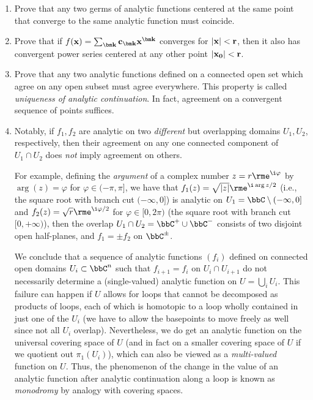 \begin{xca}
    \begin{enumerate}
        \item Prove that any two germs of analytic functions centered at the same point that converge to the same analytic function must coincide.
        \item Prove that if $f(\bf{x})=\sum_{\bm k} c_{\bm k} {\bf x}^{\bm k}$ converges for $|\bf x|<r$, then it also has convergent power series centered at any other point $|\bf{x}_0|<r$.
        \item Prove that any two analytic functions defined on a connected open set which agree on any open subset must agree everywhere. This property is called \emph{uniqueness of analytic continuation}. In fact, agreement on a convergent sequence of points suffices.
        \item Notably, if $f_1,f_2$ are analytic on two \emph{different} but overlapping domains $U_1,U_2$, respectively, then their agreement on any one connected component of $U_1\cap U_2$ does \emph{not} imply agreement on others. 
        
        For example, defining the \emph{argument}  of a complex number $z=r\rme^{\i \varphi}$ by $\arg(z)=\varphi$ for $\varphi\in (-\pi,\pi]$, we have that $f_1(z)=\sqrt{|z|}\rme^{\i \arg z/2}$ (i.e., the square root with branch cut $(-\infty,0]$) is analytic on $U_1=\bbC\setminus (-\infty,0]$ and $f_2(z)=\sqrt{r}\rme^{\i \varphi/2}$ for $\varphi\in [0,2\pi)$ (the square root with branch cut $[0,+\infty)$), then the overlap $U_1\cap U_2=\bbC^+\cup \bbC^-$ consists of two disjoint open half-planes, and $f_1=\pm f_2$ on $\bbC^\pm$. 
        
        We conclude that a sequence of analytic functions $(f_i)$ defined on connected open domains $U_i\subset\bbC^n$ such that $f_{i+1}=f_i$ on $U_i\cap U_{i+1}$ do not necessarily determine a (single-valued) analytic function on $U=\bigcup_i U_i$. This failure can happen if $U$ allows for loops that cannot be decomposed as products of loops, each of which is homotopic to a loop wholly contained in just one of the $U_i$ (we have to allow the basepoints to move freely as well since not all $U_i$ overlap). Nevertheless, we do get an analytic function on the universal covering space of $U$ (and in fact on a smaller covering space of $U$ if we quotient out $\pi_1(U_i)$), which can also be viewed as a \emph{multi-valued} function on $U$. Thus, the phenomenon of the change in the value of an analytic function after analytic continuation along a loop is known as \emph{monodromy} by analogy with covering spaces.
    \end{enumerate}
\end{xca}

